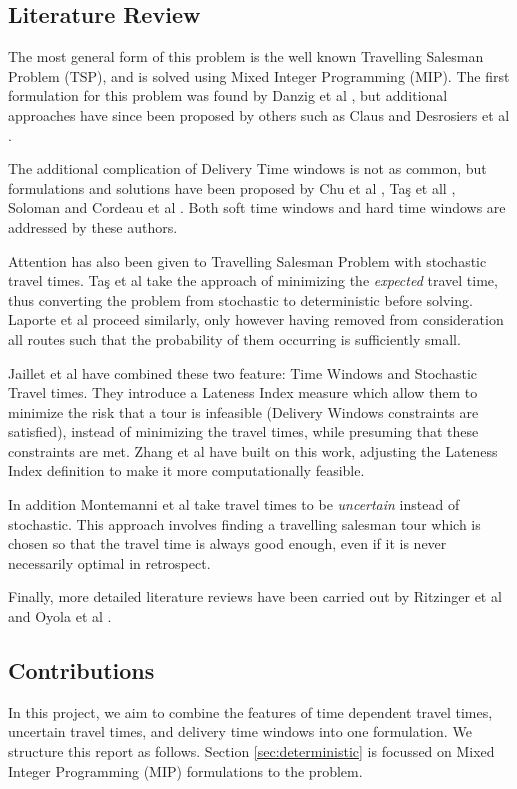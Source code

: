 \subsection{Literature Review}
\label{sec:review}
The most general form of this problem is the well known Travelling Salesman Problem (TSP), and is solved using Mixed Integer Programming (MIP). The first formulation for this problem was found by Danzig et al \cite{dantzig1954solution}, but additional approaches have since been proposed by others such as Claus \cite{claus1984new} and Desrosiers et al \cite{desrosiers1983plus}.

The additional complication of Delivery Time windows is not as common, but formulations and solutions have been proposed by Chu et al \cite{chu2017multi}, Ta\c s et all \cite{tacs2014vehicle}, Soloman \cite{solomon1987algorithms} and Cordeau et al \cite{Cordeau2001}. Both soft time windows and hard time windows are addressed by these authors.

Attention has also been given to Travelling Salesman Problem with stochastic travel times. Ta\c s et al \cite{tacs2014vehicle} take the approach of minimizing the \textit{expected} travel time, thus converting the problem from stochastic to deterministic before solving. Laporte et al \cite{laporte1992vehicle} proceed similarly, only however having removed from consideration all routes such that the probability of them occurring is sufficiently small. 

Jaillet et al \cite{jaillet2016routing} have combined these two feature: Time Windows and Stochastic Travel times. They introduce a Lateness Index measure which allow them to minimize the risk that a tour is infeasible (Delivery Windows constraints are satisfied), instead of minimizing the travel times, while presuming that these constraints are met. Zhang et al \cite{zhangrouting} have built on this work, adjusting the Lateness Index definition to make it more computationally feasible.

In addition Montemanni et al \cite{montemanni2007robust} take travel times to be \textit{uncertain} instead of stochastic. This approach involves finding a travelling salesman tour which is chosen so that the travel time is always good enough, even if it is never necessarily optimal in retrospect. 

Finally, more detailed literature reviews have been carried out by Ritzinger et al \cite{ritzinger2016survey} and Oyola et al \cite{oyola2016stochastic}.

\subsection{Contributions}
In this project, we aim to combine the features of time dependent travel times, uncertain travel times, and delivery time windows into one formulation. We structure this report as follows. Section \ref{sec:deterministic} is focussed on Mixed Integer Programming (MIP) formulations to the problem. 

